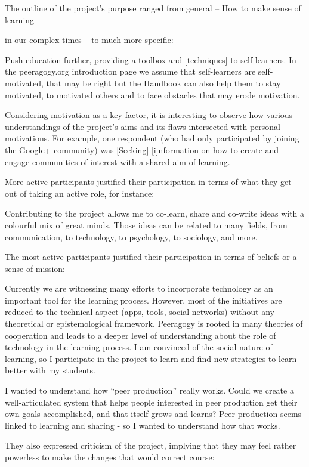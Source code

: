 \documentclass{acm_proc_article-sp}
\begin{document}
The outline of the project's purpose ranged from general -- How to make sense of learning

in our complex times -- to much more specific:

Push education further, providing a toolbox and [techniques] to self-learners. In the peeragogy.org introduction page we assume that self-learners are self-motivated, that may be right but the Handbook can also help them to stay motivated, to motivated others and to face obstacles that may erode motivation.

Considering motivation as a key factor, it is interesting to observe how various understandings of the project's aims and its flaws intersected with personal motivations. For example, one respondent (who had only participated by joining the Google+ community) was [Seeking] [i]nformation on how to create and engage communities of interest with a shared aim of learning.

More active participants justified their participation in terms of what they get out of taking an active role, for instance:

Contributing to the project allows me to co-learn, share and co-write ideas with a colourful mix of great minds. Those ideas can be related to many fields, from communication, to technology, to psychology, to sociology, and more.

The most active participants justified their participation in terms of beliefs or a sense of mission:

Currently we are witnessing many efforts to incorporate technology as an important tool for the learning process. However, most of the initiatives are reduced to the technical aspect (apps, tools, social networks) without any theoretical or epistemological framework. Peeragogy is rooted in many theories of cooperation and leads to a deeper level of understanding about the role of technology in the learning process. I am convinced of the social nature of learning, so I participate in the project to learn and find new strategies to learn better with my students.

I wanted to understand how ``peer production'' really works. Could we create a well-articulated system that helps people interested in peer production get their own goals accomplished, and that itself grows and learns? Peer production seems linked to learning and sharing - so I wanted to understand how that works.

They also expressed criticism of the project, implying that they may feel rather powerless to make the changes that would correct course:
\end{document}
